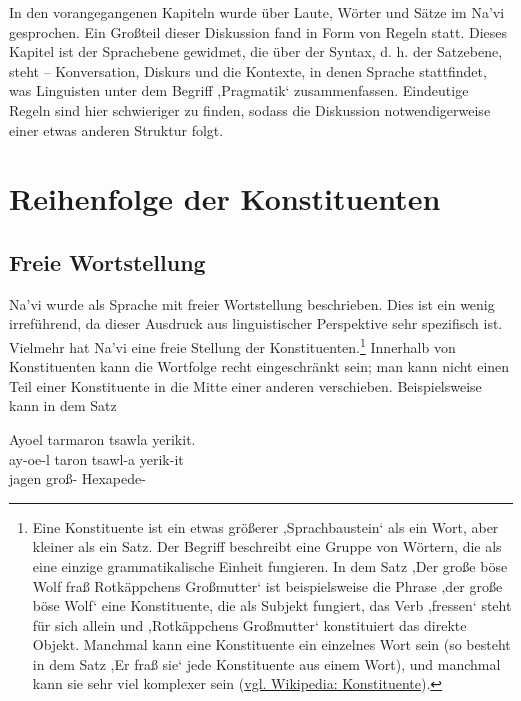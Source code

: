 
\noindent In den vorangegangenen Kapiteln wurde über Laute, Wörter und Sätze im Na'vi gesprochen. Ein Großteil dieser Diskussion fand in Form von Regeln statt. Dieses Kapitel ist der Sprachebene gewidmet, die über der Syntax, d. h. der Satzebene, steht -- Konversation, Diskurs und die Kontexte, in denen Sprache stattfindet, was Linguisten unter dem Begriff ,Pragmatik‘ zusammenfassen. Eindeutige Regeln sind hier schwieriger zu finden, sodass die Diskussion notwendigerweise einer etwas anderen Struktur folgt.


\section{Reihenfolge der Konstituenten}

\subsection{Freie Wortstellung} Na'vi wurde als Sprache mit freier Wortstellung beschrieben. Dies ist ein wenig irreführend, da dieser Ausdruck aus linguistischer Perspektive sehr spezifisch ist. Vielmehr hat Na'vi eine freie Stellung der Konstituenten.\footnote{Eine Konstituente ist ein etwas größerer ,Sprachbaustein‘ als ein Wort, aber kleiner als ein Satz. Der Begriff beschreibt eine Gruppe von Wörtern, die als eine einzige grammatikalische Einheit fungieren. In dem Satz ,Der große böse Wolf fraß Rotkäppchens Großmutter‘ ist beispielsweise die Phrase ,der große böse Wolf‘ eine Konstituente, die als Subjekt fungiert, das Verb ,fressen‘ steht für sich allein und ,Rotkäppchens Großmutter‘ konstituiert das direkte Objekt. Manchmal kann eine Konstituente ein einzelnes Wort sein (so besteht in dem Satz ,Er fraß sie‘ jede Konstituente aus einem Wort), und manchmal kann sie sehr viel komplexer sein (\href{https://de.wikipedia.org/wiki/Konstituente}{vgl. Wikipedia: Konstituente}).} Innerhalb von Konstituenten kann die Wortfolge recht eingeschränkt sein; man kann nicht einen Teil einer Konstituente in die Mitte einer anderen verschieben. Beispielsweise kann in dem Satz 

\begin{interlin}
	\glll Ayoel tarmaron tsawla yerikit. \\
	ay-oe-l taron tsawl-a yerik-it \\
	 jagen groß- Hexapede- \\
\end{interlin}

